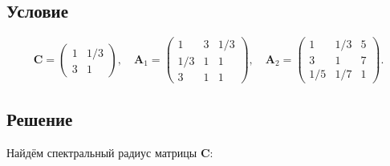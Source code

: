 \documentclass[specialist,
	substylefile = spbu.rtx,
	subf,href,colorlinks=true, 12pt]{disser}
\begin{document}
\subsection{Условие}

\[
	\mathbf{C} = \begin{pmatrix}
		1 & 1/3 \\
		3 & 1
	\end{pmatrix}, \quad
	\mathbf{A}_1 = \begin{pmatrix}
		1   & 3 & 1/3 \\
		1/3 & 1 & 1   \\
		3   & 1 & 1
	\end{pmatrix}, \quad
	\mathbf{A}_2 =  \begin{pmatrix}
		1   & 1/3 & 5 \\
		3   & 1   & 7 \\
		1/5 & 1/7 & 1
	\end{pmatrix}.
\]
\subsection{Решение}
Найдём спектральный радиус матрицы \(\mathbf{C}\):
\end{document}
